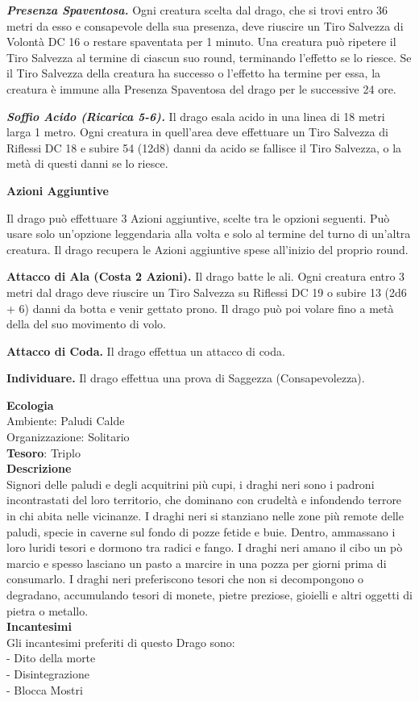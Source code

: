 \begin{multicols}{2}
	\textit{\textbf{Presenza Spaventosa.}} Ogni creatura scelta dal drago, che si trovi entro 36 metri da esso e consapevole della sua presenza, deve riuscire un Tiro Salvezza di Volontà DC 16 o restare spaventata per 1 minuto. Una creatura può ripetere il Tiro Salvezza al termine di ciascun suo round, terminando l'effetto se lo riesce. Se il Tiro Salvezza della creatura ha successo o l'effetto ha termine per essa, la creatura è immune alla Presenza Spaventosa del drago per le successive 24 ore.

	\textit{\textbf{Soffio Acido (Ricarica 5-6).}} Il drago esala acido in una linea di 18 metri larga 1 metro. Ogni creatura in quell'area deve effettuare un Tiro Salvezza di Riflessi DC 18 e subire 54 (12d8) danni da acido se fallisce il Tiro Salvezza, o la metà di questi danni se lo
	riesce.

	\textbf{Azioni Aggiuntive}

	Il drago può effettuare 3 Azioni aggiuntive, scelte tra le opzioni seguenti. Può usare solo un'opzione leggendaria alla volta e solo al termine del turno di un'altra creatura. Il drago recupera le Azioni aggiuntive spese all'inizio del proprio round.

	\textbf{Attacco di Ala (Costa 2 Azioni).} Il drago batte le ali. Ogni creatura entro 3 metri dal drago deve riuscire un Tiro Salvezza su Riflessi DC 19 o subire 13 (2d6 + 6) danni da botta e venir gettato prono. Il drago può poi volare fino a metà della del suo movimento di volo.

	\textbf{Attacco di Coda.} Il drago effettua un attacco di coda.

	\textbf{Individuare.} Il drago effettua una prova di Saggezza (Consapevolezza).

	\textbf{Ecologia}\\
	Ambiente: Paludi Calde\\
	Organizzazione: Solitario\\
	\textbf{Tesoro}: Triplo\\
	\textbf{Descrizione}\\
	Signori delle paludi e degli acquitrini più cupi, i draghi neri sono i padroni incontrastati del loro territorio, che dominano con crudeltà e infondendo terrore in chi abita nelle vicinanze. I draghi neri si stanziano nelle zone più remote delle paludi, specie in caverne sul fondo di pozze fetide e buie. Dentro, ammassano i loro luridi tesori e dormono tra radici e fango. I draghi neri amano il cibo un pò marcio e spesso lasciano un pasto a marcire in una pozza per giorni prima di consumarlo. I draghi neri preferiscono tesori che non si decompongono o degradano, accumulando tesori di monete, pietre preziose, gioielli e altri oggetti di pietra o metallo.\\
	\textbf{Incantesimi}\\
	Gli incantesimi preferiti di questo Drago sono:\\
	- Dito della morte\\
	- Disintegrazione\\
	- Blocca Mostri



\end{multicols}
